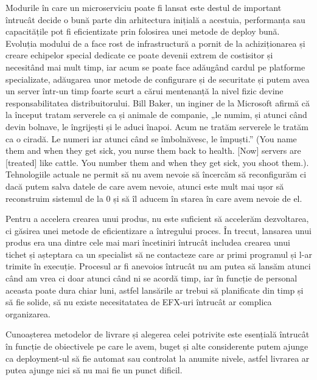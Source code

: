 Modurile în care un microserviciu poate fi lansat este destul de important întrucât
decide o bună parte din arhitectura inițială a acestuia, performanța sau capacitățile
pot fi eficientizate prin folosirea unei metode de deploy bună. Evoluția modului de a face rost
de infrastructură a pornit de la achiziționarea și creare echipelor special dedicate ce poate
devenii extrem de costisitor și necesitând mai mult timp, iar acum se poate face
adăugând cardul pe platforme specializate, adăugarea unor metode de configurare și
de securitate și putem avea un server într-un timp foarte scurt a cărui mentenanță la nivel
fizic devine responsabilitatea distribuitorului. Bill Baker, un inginer de la Microsoft
afirmă că la început tratam serverele ca și animale de companie, „le numim, și atunci
când devin bolnave, le îngrijești și le aduci înapoi. Acum ne tratăm serverele le tratăm
ca o ciradă. Le numeri iar atunci când se îmbolnăvesc, le împuști.” (You name them and when they get sick,
you nurse them back to health. [Now] servers are [treated] like cattle. You number them and when they
get sick, you shoot them.). Tehnologiile actuale ne permit să nu avem nevoie să încercăm să
reconfigurăm ci dacă putem salva datele de care avem nevoie, atunci este mult mai ușor să
reconstruim sistemul de la 0 și să îl aducem în starea în care avem nevoie de el.

Pentru a accelera crearea unui produs, nu este suficient să accelerăm dezvoltarea, ci găsirea
unei metode de eficientizare a întregului proces. În trecut, lansarea unui produs era una dintre cele
mai mari încetiniri întrucât includea crearea unui tichet și așteptara ca un specialist
să ne contacteze care ar primi programul și l-ar trimite în execuție. Procesul ar fi anevoios
întrucât nu am putea să lansăm atunci când am vrea ci doar atunci când ni se acordă timp, iar
în funcție de personal aceasta poate dura chiar luni, astfel lansările ar trebui să planificate
din timp și să fie solide, să nu existe necesitatatea de EFX-uri întrucât ar complica organizarea.

Cunoașterea metodelor de livrare și alegerea celei potrivite este esențială întrucât în
funcție de obiectivele pe care le avem, buget și alte considerente putem ajunge ca deployment-ul
să fie automat sau controlat la anumite nivele, astfel livrarea ar putea ajunge nici să nu mai fie
un punct dificil.
